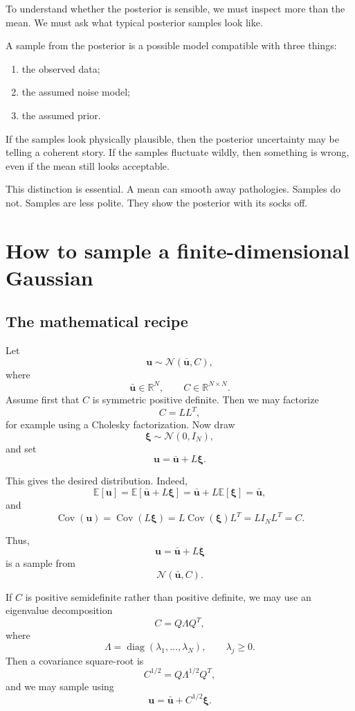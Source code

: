 \documentclass[11pt,a4paper]{book}
\begin{document}
To understand whether the posterior is sensible, we must inspect more than the
mean. We must ask what typical posterior samples look like.

A sample from the posterior is a possible model compatible with three things:
\begin{enumerate}[label=\arabic*.]
    \item the observed data;
    \item the assumed noise model;
    \item the assumed prior.
\end{enumerate}

If the samples look physically plausible, then the posterior uncertainty may be
telling a coherent story. If the samples fluctuate wildly, then something is
wrong, even if the mean still looks acceptable.

This distinction is essential. A mean can smooth away pathologies. Samples do
not. Samples are less polite. They show the posterior with its socks off.

\section{How to sample a finite-dimensional Gaussian}

\subsection{The mathematical recipe}

Let
\[
    \bm{u} \sim \mathcal{N}(\bar{\bm{u}},C),
\]
where
\[
    \bar{\bm{u}} \in \mathbb{R}^N,
    \qquad
    C \in \mathbb{R}^{N\times N}.
\]
Assume first that $C$ is symmetric positive definite. Then we may factorize
\[
    C = LL^T,
\]
for example using a Cholesky factorization. Now draw
\[
    \bm{\xi} \sim \mathcal{N}(0,I_N),
\]
and set
\[
    \bm{u}
    =
    \bar{\bm{u}} + L\bm{\xi}.
\]

This gives the desired distribution. Indeed,
\[
    \mathbb{E}[\bm{u}]
    =
    \mathbb{E}[\bar{\bm{u}} + L\bm{\xi}]
    =
    \bar{\bm{u}} + L\mathbb{E}[\bm{\xi}]
    =
    \bar{\bm{u}},
\]
and
\[
    \operatorname{Cov}(\bm{u})
    =
    \operatorname{Cov}(L\bm{\xi})
    =
    L\operatorname{Cov}(\bm{\xi})L^T
    =
    L I_N L^T
    =
    C.
\]

Thus,
\[
    \bm{u}
    =
    \bar{\bm{u}} + L\bm{\xi}
\]
is a sample from
\[
    \mathcal{N}(\bar{\bm{u}},C).
\]

If $C$ is positive semidefinite rather than positive definite, we may use an
eigenvalue decomposition
\[
    C = Q\Lambda Q^T,
\]
where
\[
    \Lambda
    =
    \operatorname{diag}(\lambda_1,\ldots,\lambda_N),
    \qquad
    \lambda_j \geq 0.
\]
Then a covariance square-root is
\[
    C^{1/2}
    =
    Q\Lambda^{1/2}Q^T,
\]
and we may sample using
\[
    \bm{u}
    =
    \bar{\bm{u}} + C^{1/2}\bm{\xi}.
\]
\end{document}
